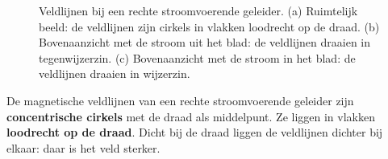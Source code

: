 \documentclass{ximera}
\begin{document}
\begin{figure}[ht!]
    \captionsetup{width=0.85\textwidth}
    \begin{center}
    \end{center}
    \caption{Veldlijnen bij een rechte stroomvoerende geleider. (a) Ruimtelijk beeld: de veldlijnen zijn cirkels in vlakken loodrecht op de draad. (b) Bovenaanzicht met de stroom uit het blad: de veldlijnen draaien in tegenwijzerzin. (c) Bovenaanzicht met de stroom in het blad: de veldlijnen draaien in wijzerzin.}
    \label{fig:veld_rechte_geleider}
\end{figure}

\begin{proposition}[foldable=true,title={Veldlijnen bij een rechte stroomvoerende geleider}]\nl
    De magnetische veldlijnen van een rechte stroomvoerende geleider zijn \textbf{concentrische cirkels} met de draad als middelpunt. Ze liggen in vlakken \textbf{loodrecht op de draad}. Dicht bij de draad liggen de veldlijnen dichter bij elkaar: daar is het veld sterker.
\end{proposition}
\end{document}
